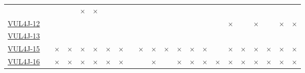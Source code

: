 \begin{table}[!htbp]
{\begin{tabular}{|l|lll|ll|ll||lll|ll|ll||lll|ll|ll|}
		\cellcolor{yellow}\halfcheckmark & \cellcolor{green}\checkmark &
		\cellcolor{yellow}\halfcheckmark & \cellcolor{green}\checkmark & \cellcolor{red}$\times$ & \cellcolor{red}$\times$\\ 
		\href{https://github.com/apache/commons-imaging/commit/6a79d35d6654d895d0a4b73b3a9282ec9aaeeb06}{VUL4J-12} & \cellcolor{green}\checkmark & \cellcolor{green}\checkmark & \cellcolor{green}\checkmark & \cellcolor{green}\checkmark & \cellcolor{green}\checkmark & \cellcolor{green}\checkmark & \cellcolor{green}\checkmark  & \cellcolor{green}\checkmark & \cellcolor{green}\checkmark & \cellcolor{green}\checkmark & \cellcolor{green}\checkmark & \cellcolor{green}\checkmark & \cellcolor{green}\checkmark & \cellcolor{green}\checkmark     & \cellcolor{green}\checkmark & \cellcolor{red}$\times$ & \cellcolor{green}\checkmark & \cellcolor{red}$\times$ & \cellcolor{green}\checkmark & \cellcolor{red}$\times$ & \cellcolor{red}$\times$\\ 
		\href{https://github.com/apache/commons-imaging/commit/f5574bfe285edd79207fe8c30f53cb0af06e26bb}{VUL4J-13} & \cellcolor{green}\checkmark & \cellcolor{green}\checkmark & \cellcolor{green}\checkmark & \cellcolor{green}\checkmark & \cellcolor{green}\checkmark & \cellcolor{green}\checkmark & \cellcolor{green}\checkmark  & \cellcolor{green}\checkmark & \cellcolor{green}\checkmark & \cellcolor{green}\checkmark & \cellcolor{green}\checkmark & \cellcolor{green}\checkmark & \cellcolor{green}\checkmark & \cellcolor{green}\checkmark     & \cellcolor{green}\checkmark & \cellcolor{green}\checkmark & \cellcolor{green}\checkmark & \cellcolor{green}\checkmark & \cellcolor{green}\checkmark & \cellcolor{green}\checkmark & \cellcolor{green}\checkmark\\ 
		\href{https://github.com/apache/cxf/commit/d9e2a6e7}{VUL4J-15} & \cellcolor{green}\checkmark & \cellcolor{red}$\times$ & \cellcolor{red}$\times$ & \cellcolor{red}$\times$ & \cellcolor{red}$\times$ & \cellcolor{red}$\times$ & \cellcolor{red}$\times$  & \cellcolor{green}\checkmark & \cellcolor{red}$\times$ & \cellcolor{red}$\times$ & \cellcolor{red}$\times$ & \cellcolor{red}$\times$ & \cellcolor{red}$\times$ & \cellcolor{red}$\times$     & \cellcolor{green}\checkmark & \cellcolor{red}$\times$ & \cellcolor{red}$\times$ & \cellcolor{red}$\times$ & \cellcolor{red}$\times$ & \cellcolor{red}$\times$ & \cellcolor{red}$\times$\\ 
		\href{https://github.com/apache/cxf/commit/845eccb6484b43ba02875c71e824db23ae4f20c0}{VUL4J-16} & \cellcolor{green}\checkmark & \cellcolor{red}$\times$ & \cellcolor{red}$\times$ & \cellcolor{red}$\times$ & \cellcolor{red}$\times$ & \cellcolor{red}$\times$ & \cellcolor{red}$\times$  & \cellcolor{green}\checkmark & \cellcolor{yellow}\halfcheckmark & \cellcolor{red}$\times$ & \cellcolor{yellow}\halfcheckmark & \cellcolor{red}$\times$ & \cellcolor{red}$\times$ & \cellcolor{red}$\times$     & \cellcolor{red}$\times$ & \cellcolor{red}$\times$ & \cellcolor{red}$\times$ & \cellcolor{red}$\times$ & \cellcolor{red}$\times$ & \cellcolor{red}$\times$ & \cellcolor{red}$\times$\\ 

\end{tabular}}
\end{table}
